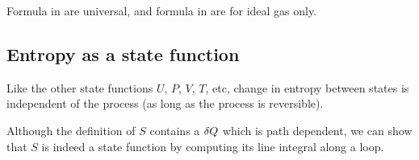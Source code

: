 \documentclass[class=article, crop=false, 12pt]{standalone}
\begin{document}
Formula in  are universal, 
and formula in  are for ideal gas only.


\subsection{Entropy as a state function}

Like the other state functions $U$, $P$, $V$, $T$, etc, 
change in entropy between states is independent of the process (as long as the process is reversible).

Although the definition of $S$ contains a $\var{Q}$ which is path dependent,
we can show that $S$ is indeed a state function by computing its line integral along a loop.
\end{document}
